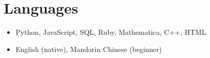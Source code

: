 \documentclass{cultvoucher}
\begin{document}
\section{Languages}
\begin{itemize}
      \item Python, JavaScript, SQL, Ruby, Mathematica, C++, HTML
      \item English (native), Mandarin Chinese (beginner)
\end{itemize}
\end{document}
